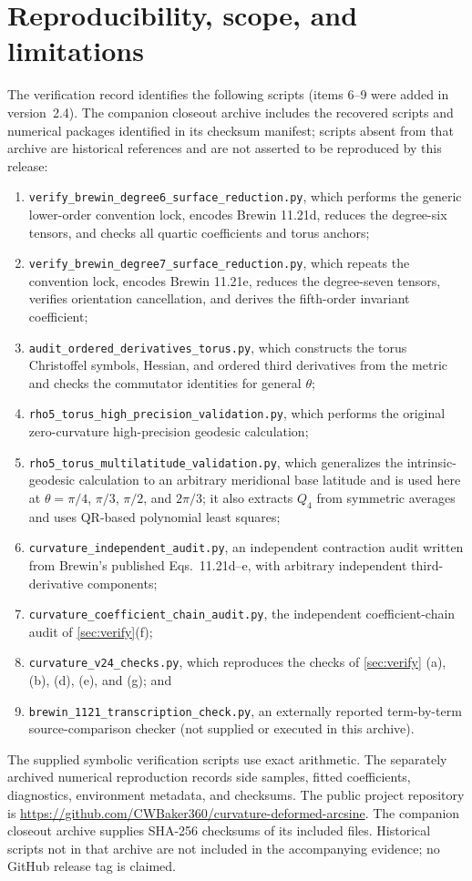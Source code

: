 \documentclass[11pt]{amsart}
\numberwithin{equation}{section}
\theoremstyle{remark}
\begin{document}
\FloatBarrier
\section{Reproducibility, scope, and limitations}\label{sec:repro}

The verification record identifies the following scripts (items 6--9 were added in version~2.4). The companion closeout archive includes the recovered scripts and numerical packages identified in its checksum manifest; scripts absent from that archive are historical references and are not asserted to be reproduced by this release:
\begin{enumerate}[leftmargin=2em]
\item \texttt{verify\_brewin\_degree6\_surface\_reduction.py}, which performs the generic lower-order convention lock, encodes Brewin 11.21d, reduces the degree-six tensors, and checks all quartic coefficients and torus anchors;
\item \texttt{verify\_brewin\_degree7\_surface\_reduction.py}, which repeats the convention lock, encodes Brewin 11.21e, reduces the degree-seven tensors, verifies orientation cancellation, and derives the fifth-order invariant coefficient;
\item \texttt{audit\_ordered\_derivatives\_torus.py}, which constructs the torus Christoffel symbols, Hessian, and ordered third derivatives from the metric and checks the commutator identities for general $\theta$;
\item \texttt{rho5\_torus\_high\_precision\_validation.py}, which performs the original zero-curvature high-precision geodesic calculation;
\item \texttt{rho5\_torus\_multilatitude\_validation.py}, which generalizes the intrinsic-geodesic calculation to an arbitrary meridional base latitude and is used here at $\theta=\pi/4$, $\pi/3$, $\pi/2$, and $2\pi/3$; it also extracts $Q_4$ from symmetric averages and uses QR-based polynomial least squares;
\item \texttt{curvature\_independent\_audit.py}, an independent contraction audit written from Brewin's published Eqs.~11.21d--e, with arbitrary independent third-derivative components;
\item \texttt{curvature\_coefficient\_chain\_audit.py}, the independent coefficient-chain audit of \cref{sec:verify}(f);
\item \texttt{curvature\_v24\_checks.py}, which reproduces the checks of \cref{sec:verify} (a), (b), (d), (e), and (g); and
\item \texttt{brewin\_1121\_transcription\_check.py}, an externally reported term-by-term source-comparison checker (not supplied or executed in this archive).
\end{enumerate}
The supplied symbolic verification scripts use exact arithmetic. The separately archived numerical reproduction records side samples, fitted coefficients, diagnostics, environment metadata, and checksums.
The public project repository is \url{https://github.com/CWBaker360/curvature-deformed-arcsine}.  The companion closeout archive supplies SHA-256 checksums of its included files. Historical scripts not in that archive are not included in the accompanying evidence; no GitHub release tag is claimed.
\end{document}
